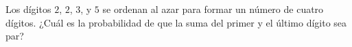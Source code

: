 Los dígitos $2$, $2$, $3$, y $5$ se ordenan al azar para formar un número de cuatro dígitos. ¿Cuál es la probabilidad de que la suma del primer y el último dígito sea par?